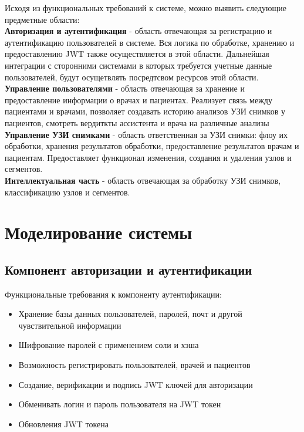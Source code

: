 Исходя из функциональных требований к системе, можно выявить следующие предметные области:\\
\textbf{Авторизация и аутентификация} - область отвечающая за регистрацию и аутентификацию пользователей 
в системе. Вся логика по обработке, хранению и предоставлению JWT также осуществляется в этой области. 
Дальнейшая интеграции с сторонними системами в которых требуется учетные данные пользователей, будут осущетвлять 
посредтсвом ресурсов этой области. \\
\textbf{Управление пользователями} - область отвечающая за хранение и предоставление информации о врачах и пациентах. 
Реализует связь между пациентами и врачами, позволяет создавать историю анализов УЗИ снимков у пациентов, 
смотреть вердиткты ассистента и врача на различные анализы \\
\textbf{Управление УЗИ снимками} - область ответственная за УЗИ снимки: флоу их обработки, хранения результатов обработки, 
предоставление результатов врачам и пациентам. Предоставляет функционал изменения, создания и удаления узлов и сегментов.\\
\textbf{Интеллектуальная часть} - область отвечающая за обработку УЗИ снимков, классификацию узлов и сегментов.

\section{Моделирование системы}

\subsection{Компонент авторизации и аутентификации}

Функциональные требования к компоненту аутентификации:
\begin{itemize}
  \item Хранение базы данных пользователей, паролей, почт и другой чувствительной информации
  \item Шифрование паролей с применением соли и хэша
  \item Возможность регистрировать пользователей, врачей и пациентов
  \item Создание, верификации и подпись JWT ключей для авторизации
  \item Обменивать логин и пароль пользователя на JWT токен
  \item Обновления JWT токена
\end{itemize}

